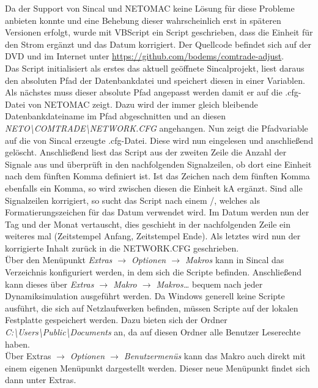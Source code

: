 \documentclass{scrartcl}
\begin{document}
\begin{onehalfspace}
Da der Support von Sincal und NETOMAC keine Lösung für diese Probleme anbieten konnte und eine Behebung dieser wahrscheinlich erst in späteren Versionen erfolgt, wurde mit VBScript ein Script geschrieben, dass die Einheit für den Strom ergänzt und das Datum korrigiert. Der Quellcode befindet sich auf der DVD und im Internet unter \url{https://github.com/bodems/comtrade-adjust}. \\
Das Script initialisiert als erstes das aktuell geöffnete Sincalprojekt, liest daraus den absoluten Pfad der Datenbankdatei und speichert diesen in einer Variablen. Als nächstes muss dieser absolute Pfad angepasst werden damit er auf die .cfg-Datei von NETOMAC zeigt. Dazu wird der immer gleich bleibende Datenbankdateiname im Pfad abgeschnitten und an diesen \textit{\glqq NETO\textbackslash COMTRADE\textbackslash NETWORK.CFG \grqq{}} angehangen. Nun zeigt die Pfadvariable auf die von Sincal erzeugte .cfg-Datei. Diese wird nun eingelesen und anschließend gelöscht. Anschließend liest das Script aus der zweiten Zeile die Anzahl der Signale aus und überprüft in den nachfolgenden Signalzeilen, ob dort eine Einheit nach dem fünften Komma definiert ist. Ist das Zeichen nach dem fünften Komma ebenfalls ein Komma, so wird zwischen diesen die Einheit \glqq kA\grqq{} ergänzt. Sind alle Signalzeilen korrigiert, so sucht das Script nach einem \glqq /\grqq, welches als Formatierungszeichen für das Datum verwendet wird. Im Datum werden nun der Tag und der Monat vertauscht, dies geschieht in der nachfolgenden Zeile ein weiteres mal (Zeitstempel Anfang, Zeitstempel Ende). Als letztes wird nun der korrigierte Inhalt zurück in die NETWORK.CFG geschrieben. \\
Über den Menüpunkt \textit{Extras $\rightarrow$ Optionen $\rightarrow$ Makros} kann in Sincal das Verzeichnis konfiguriert werden, in dem sich die Scripte befinden. Anschließend kann dieses über \textit{Extras $\rightarrow$ Makro $\rightarrow$ Makros…} bequem nach jeder Dynamiksimulation ausgeführt werden. Da Windows generell keine Scripte ausführt, die sich auf Netzlaufwerken befinden, müssen Scripte auf der lokalen Festplatte gespeichert werden. Dazu bieten sich der Ordner \textit{C:\textbackslash Users\textbackslash Public\textbackslash Documents} an, da auf diesen Ordner alle Benutzer Leserechte haben. \\
Über Extras \textit{$\rightarrow$ Optionen $\rightarrow$ Benutzermenüs} kann das Makro auch direkt mit einem eigenen Menüpunkt dargestellt werden. Dieser neue Menüpunkt findet sich dann unter \glqq Extras\grqq.
\begin{figure}[H]

\end{figure}
\end{onehalfspace}
\end{document}
